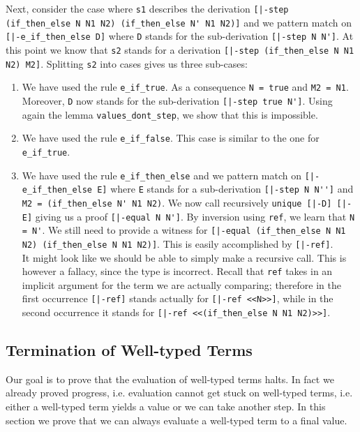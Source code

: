 Next, consider the case where \lstinline!s1! describes the derivation
\lstinline![|-step (if_then_else N N1 N2) (if_then_else N' N1 N2)]! and we pattern match on
\lstinline![|-e_if_then_else D]! where \lstinline!D! stands for the sub-derivation 
\lstinline![|-step N N']!. At this point we know that \lstinline!s2! stands
for a derivation \lstinline![|-step (if_then_else N N1 N2) M2]!. Splitting
\lstinline!s2! into cases gives us three sub-cases: 

\begin{enumerate}
\item We have used the rule \lstinline!e_if_true!. As a consequence
  \lstinline!N = true! and \lstinline!M2 = N1!. Moreover,  
  \lstinline!D! now stands for the sub-derivation \lstinline![|-step true N']!. 
  Using again the lemma \lstinline!values_dont_step!, we show that this is impossible.
\item We have used the rule \lstinline!e_if_false!. This case is similar to
  the one for \lstinline!e_if_true!.
\item We have used the rule \lstinline!e_if_then_else! and we pattern match on 
\lstinline![|-e_if_then_else E]! where \lstinline!E! stands for a sub-derivation
\lstinline![|-step N N'']! and \lstinline!M2 = (if_then_else N' N1 N2)!.
We now call recursively \lstinline!unique [|-D] [|-E]! giving us a proof 
\lstinline![|-equal N N']!. By inversion using \lstinline!ref!, we learn that
\lstinline!N = N'!. We still need to provide a witness for 
\lstinline![|-equal (if_then_else N N1 N2) (if_then_else N N1 N2)]!. This is easily
accomplished by \lstinline![|-ref]!. \\[0.5em]
It might look like we should be able to simply make a recursive call. This is
however a fallacy, since the type is incorrect. Recall that \lstinline!ref!
takes in an implicit argument for the term we are actually comparing; therefore
in the first occurrence \lstinline![|-ref]! stands actually for
\lstinline![|-ref <<N>>]!, while in the second occurrence it %
stands for \lstinline![|-ref <<(if_then_else N N1 N2)>>]!.
\end{enumerate}


\subsection{Termination of Well-typed Terms}
Our goal is to prove that the evaluation of well-typed terms halts. In
fact we already proved progress, i.e. evaluation cannot get stuck on
well-typed terms, i.e. either a well-typed term yields a value or we
can take another step. In this section we prove that we can always
evaluate a well-typed term to a final value.

